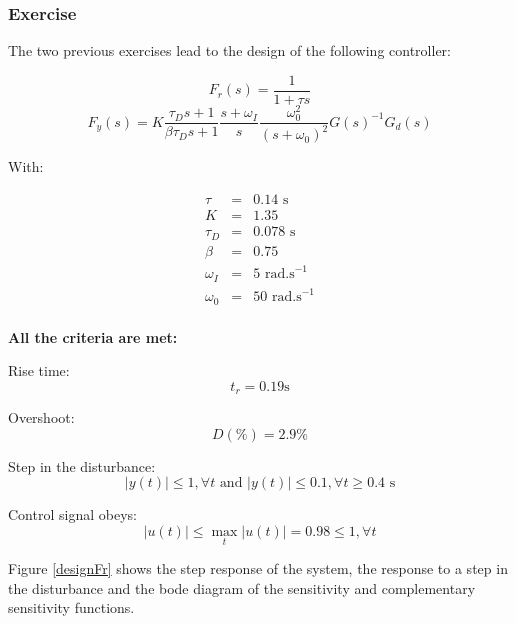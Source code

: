 \subsubsection{Exercise}

The two previous exercises lead to the design of the following controller:

$$F_r(s) = \frac{1}{1 + \tau s}$$
$$F_y(s) = K \frac{\tau_D s + 1}{\beta \tau_D s +1}\frac{s + \omega_I}{s} \frac{\omega_0^2}{(s+\omega_0)^2}G(s)^{-1} G_d(s)$$

With:

$$\begin{array}{rcl}
    \tau & = & 0.14 \text{ s}\\ 
    K &  = & 1.35\\
    \tau_D &  = & 0.078\text{ s}\\
    \beta &  = & 0.75\\
 \omega_I &  = & 5 \text{ rad.s}^{-1}\\
    \omega_0 &  = & 50 \text{ rad.s}^{-1}\\
\end{array}$$

\textbf{All the criteria are met:}

\begin{shortitemize}
    \item Rise time:
        $$t_r = 0.19\text{s}$$
    \item Overshoot:
        $$D(\%) =  2.9\%$$
    \item Step in the disturbance:
        $$|y(t)| \leq 1, \forall t \text{ and } |y(t)| \leq 0.1, \forall t \geq 0.4\text{ s}$$ 
    \item Control signal obeys:
        $$|u(t)| \leq \max_t |u(t)| = 0.98 \leq 1, \forall t$$
\end{shortitemize}

Figure \ref{designFr} shows the step response of the system, the response to a step in the disturbance and the bode diagram of the sensitivity and complementary sensitivity functions.

